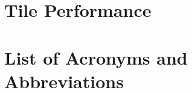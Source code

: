 \documentclass[12pt, final]{ucthesis}
\begin{document}
\begin{dissertationText}
\chapter{Tile Performance                  %
    \label{appen:tile_perf}}                
    		

\chapter{List of Acronyms and Abbreviations  %
		\label{appen:acro}}
		
		
\end{dissertationText}
\end{document}
